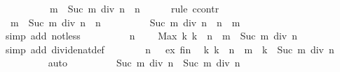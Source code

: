 \begin{isabellebody}
\ \ \isamarkupfalse%
\ {\isacharminus}{\kern0pt}\isanewline
\ \ \ \ \isamarkupfalse%
\ {\isachardoublequoteopen}m\ {\isacharless}{\kern0pt}\ Suc\ {\isacharparenleft}{\kern0pt}m\ div\ n{\isacharparenright}{\kern0pt}\ {\isacharasterisk}{\kern0pt}\ n{\isachardoublequoteclose}\isanewline
\ \ \ \ \isamarkupfalse%
\ {\isacharparenleft}{\kern0pt}rule\ ccontr{\isacharparenright}{\kern0pt}\isanewline
\ \ \ \ \ \ \isamarkupfalse%
\ {\isachardoublequoteopen}{\isasymnot}\ m\ {\isacharless}{\kern0pt}\ Suc\ {\isacharparenleft}{\kern0pt}m\ div\ n{\isacharparenright}{\kern0pt}\ {\isacharasterisk}{\kern0pt}\ n{\isachardoublequoteclose}\isanewline
\ \ \ \ \ \ \isamarkupfalse%
\ \isamarkupfalse%
\ {\isachardoublequoteopen}Suc\ {\isacharparenleft}{\kern0pt}m\ div\ n{\isacharparenright}{\kern0pt}\ {\isacharasterisk}{\kern0pt}\ n\ {\isasymle}\ m{\isachardoublequoteclose}\isanewline
\ \ \ \ \ \ \ \ \isamarkupfalse%
\ {\isacharparenleft}{\kern0pt}simp\ add{\isacharcolon}{\kern0pt}\ not{\isacharunderscore}{\kern0pt}less{\isacharparenright}{\kern0pt}\isanewline
\ \ \ \ \ \ \isamarkupfalse%
\ \isamarkupfalse%
\ {\isacartoucheopen}n\ {\isasymnoteq}\ {}{\isacartoucheclose}\ \isamarkupfalse%
\ {\isachardoublequoteopen}Max\ {\isacharbraceleft}{\kern0pt}k{\isachardot}{\kern0pt}\ k\ {\isacharasterisk}{\kern0pt}\ n\ {\isasymle}\ m{\isacharbraceright}{\kern0pt}\ {\isacharless}{\kern0pt}\ Suc\ {\isacharparenleft}{\kern0pt}m\ div\ n{\isacharparenright}{\kern0pt}{\isachardoublequoteclose}\isanewline
\ \ \ \ \ \ \ \ \isamarkupfalse%
\ {\isacharparenleft}{\kern0pt}simp\ add{\isacharcolon}{\kern0pt}\ divide{\isacharunderscore}{\kern0pt}nat{\isacharunderscore}{\kern0pt}def{\isacharparenright}{\kern0pt}\isanewline
\ \ \ \ \ \ \isamarkupfalse%
\ {\isacartoucheopen}n\ {\isasymnoteq}\ {}{\isacartoucheclose}\ ex\ fin\ \isamarkupfalse%
\ {\isachardoublequoteopen}{\isasymAnd}k{\isachardot}{\kern0pt}\ k\ {\isacharasterisk}{\kern0pt}\ n\ {\isasymle}\ m\ {\isasymLongrightarrow}\ k\ {\isacharless}{\kern0pt}\ Suc\ {\isacharparenleft}{\kern0pt}m\ div\ n{\isacharparenright}{\kern0pt}{\isachardoublequoteclose}\isanewline
\ \ \ \ \ \ \ \ \isamarkupfalse%
\ auto\isanewline
\ \ \ \ \ \ \isamarkupfalse%
\ \isamarkupfalse%
\ {\isachardoublequoteopen}Suc\ {\isacharparenleft}{\kern0pt}m\ div\ n{\isacharparenright}{\kern0pt}\ {\isacharless}{\kern0pt}\ Suc\ {\isacharparenleft}{\kern0pt}m\ div\ n{\isacharparenright}{\kern0pt}{\isachardoublequoteclose}\isanewline

\end{isabellebody}
